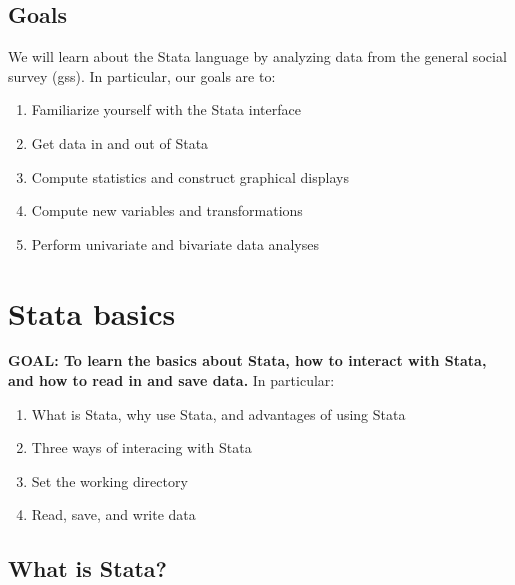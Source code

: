 \documentclass[
]{book}
\providecommand{\tightlist}{%
  \setlength{\itemsep}{0pt}\setlength{\parskip}{0pt}}
\begin{document}
\hypertarget{goals-5}{%
\subsection{Goals}\label{goals-5}}

\begin{alert}

We will learn about the Stata language by analyzing data from the general social survey (gss).
In particular, our goals are to:

\begin{enumerate}
\def\labelenumi{\arabic{enumi}.}
\tightlist
\item
  Familiarize yourself with the Stata interface
\item
  Get data in and out of Stata
\item
  Compute statistics and construct graphical displays
\item
  Compute new variables and transformations
\item
  Perform univariate and bivariate data analyses
\end{enumerate}

\end{alert}

\hypertarget{stata-basics}{%
\section{Stata basics}\label{stata-basics}}

\begin{alert}

\textbf{GOAL: To learn the basics about Stata, how to interact with Stata, and how to read in and save data.} In particular:

\begin{enumerate}
\def\labelenumi{\arabic{enumi}.}
\tightlist
\item
  What is Stata, why use Stata, and advantages of using Stata
\item
  Three ways of interacing with Stata
\item
  Set the working directory
\item
  Read, save, and write data
\end{enumerate}

\end{alert}

\hypertarget{what-is-stata}{%
\subsection{What is Stata?}\label{what-is-stata}}
\end{document}
